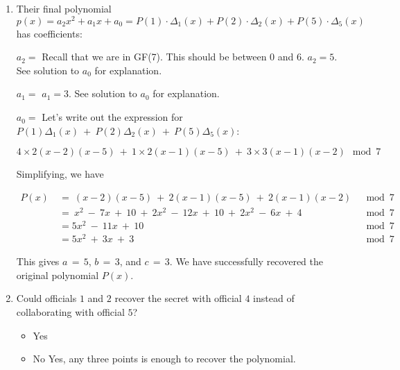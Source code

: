 \documentclass[11pt, preview]{standalone} %
\begin{document}
\begin{enumerate}
\begin{enumerate}
 
 \item Their final polynomial $p(x) = a_2 x^2 + a_1 x + a_0 = P(1)\cdot\Delta_1(x) + P(2)\cdot\Delta_2(x) + P(5)\cdot\Delta_5(x)$ has coefficients:
  \begin{Freeform}{5}
 $a_2 = $
 \Hint Recall that we are in GF(7). This should be between $0$ and $6$.
 \Solution $a_2 = 5$. See solution to $a_0$ for explanation.
 \end{Freeform}
  \begin{Freeform}{3}
 $a_1 = $
 \Solution $a_1 = 3$. See solution to $a_0$ for explanation.
 \end{Freeform}
  \begin{Freeform}{3}
 $a_0 = $
 \Solution Let's write out the expression for $P(1)\Delta_1(x)\ +\ P(2)\Delta_2(x)\ +\ P(5)\Delta_5(x)$:

 $$4 \times 2(x - 2)(x - 5)\ +\ 1 \times 2(x - 1)(x - 5)\ +\ 3 \times 3(x - 1)(x - 2)\ \bmod 7$$

Simplifying, we have  

 \begin{align*}
 P(x)\ &=\ (x - 2)(x - 5)\ +\ 2(x - 1)(x - 5)\ +\ 2(x - 1)(x - 2)\ &\bmod 7\\
 &=\ x^2\ -\ 7x\ +\ 10\ +\ 2x^2\ -\ 12x\ +\ 10\ +\ 2x^2\ -\ 6x\ +\ 4\ &\bmod 7\\
 &= 5x^2\ -\ 11x\ +\ 10\ &\bmod 7\\
 &= 5x^2\ +\ 3x\ +\ 3\ &\bmod 7 
 \end{align*}

 This gives $a\, =\, 5$, $b\, =\, 3$, and $c\, =\, 3$. We have successfully recovered the original polynomial $P(x)$.

 \end{Freeform}
 
 \item Could officials $1$ and $2$ recover the secret with official $4$ instead of collaborating with official $5$?
 \begin{Choices}
\begin{itemize}
\TrueChoice\item Yes 
\FalseChoice\item No
\Solution Yes, any three points is enough to recover the polynomial.
\end{itemize}
\end{Choices}


\end{enumerate}
\end{enumerate}
\end{document}
